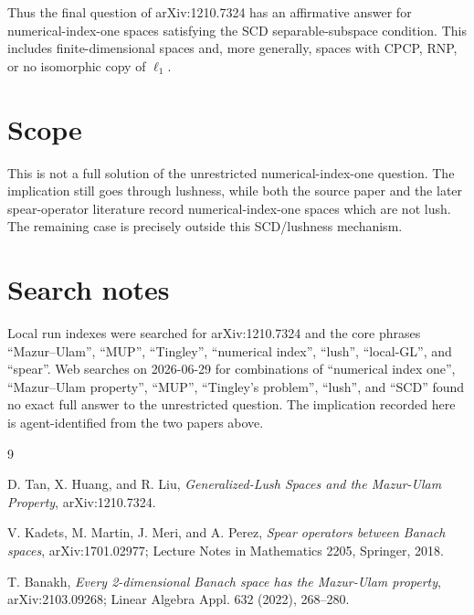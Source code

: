 \documentclass[11pt]{article}
\begin{document}
Thus the final question of arXiv:1210.7324 has an affirmative answer for
numerical-index-one spaces satisfying the SCD separable-subspace condition.
This includes finite-dimensional spaces and, more generally, spaces with
CPCP, RNP, or no isomorphic copy of \(\ell_1\).

\section*{Scope}

This is not a full solution of the unrestricted numerical-index-one question.
The implication still goes through lushness, while both the source paper and
the later spear-operator literature record numerical-index-one spaces which
are not lush.  The remaining case is precisely outside this SCD/lushness
mechanism.

\section*{Search notes}

Local run indexes were searched for arXiv:1210.7324 and the core phrases
``Mazur--Ulam'', ``MUP'', ``Tingley'', ``numerical index'', ``lush'',
``local-GL'', and ``spear''.  Web searches on 2026-06-29 for combinations of
``numerical index one'', ``Mazur--Ulam property'', ``MUP'', ``Tingley's
problem'', ``lush'', and ``SCD'' found no exact full answer to the unrestricted
question.  The implication recorded here is agent-identified from the two
papers above.

\begin{thebibliography}{9}

D. Tan, X. Huang, and R. Liu,
\emph{Generalized-Lush Spaces and the Mazur-Ulam Property},
arXiv:1210.7324.

V. Kadets, M. Martin, J. Meri, and A. Perez,
\emph{Spear operators between Banach spaces},
arXiv:1701.02977; Lecture Notes in Mathematics 2205, Springer, 2018.

T. Banakh,
\emph{Every 2-dimensional Banach space has the Mazur-Ulam property},
arXiv:2103.09268; Linear Algebra Appl. 632 (2022), 268--280.

\end{thebibliography}
\end{document}
